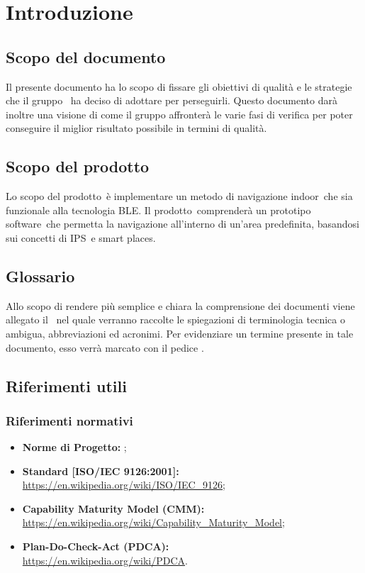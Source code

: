 \documentclass[../PianoDiQualifica.tex]{subfiles}
\begin{document}
\section{Introduzione}
	\subsection{Scopo del documento}
	Il presente documento ha lo scopo di fissare gli obiettivi di qualità e le strategie che il gruppo \leaf\ ha deciso di adottare per perseguirli. Questo documento darà inoltre una visione di come il gruppo affronterà le varie fasi di verifica per poter conseguire il miglior risultato possibile in termini di qualità.
	\subsection{Scopo del prodotto}
	Lo scopo del prodotto\g\ è implementare un metodo di navigazione indoor\g\ che sia funzionale alla tecnologia BLE\g.
	Il prodotto\g\ comprenderà un prototipo software\g\ che permetta la navigazione all'interno di un'area predefinita, basandosi sui concetti di IPS\g\ e smart places\g.
	\subsection{Glossario}
	Allo scopo di rendere più semplice e chiara la comprensione dei documenti viene allegato il \glossariov\ nel quale verranno raccolte le spiegazioni di  terminologia tecnica o ambigua,
abbreviazioni ed acronimi. Per evidenziare un termine presente in tale documento, esso verrà marcato con il pedice \g.
	\subsection{Riferimenti utili}
		\subsubsection{Riferimenti normativi}
		\begin{itemize}
			\item \textbf{Norme di Progetto:} \normediprogettov;
			\item \textbf{Standard [ISO/IEC 9126:2001]:} \\\url{https://en.wikipedia.org/wiki/ISO/IEC\_9126};
			\item \textbf{Capability Maturity Model (CMM\g):} \\\url{https://en.wikipedia.org/wiki/Capability\_Maturity\_Model};
			\item \textbf{Plan-Do-Check-Act (PDCA\g):} \\\url{https://en.wikipedia.org/wiki/PDCA}.
		\end{itemize}
\end{document}

